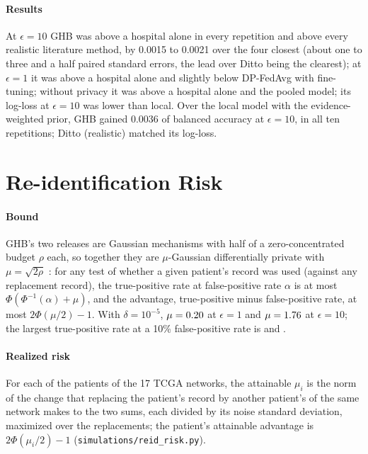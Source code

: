 \documentclass[acmsmall,screen,nonacm]{acmart}
\theoremstyle{acmdefinition}
\begin{document}
\paragraph{Results} At $\epsilon=10$ GHB was above a hospital alone in every repetition and above every realistic literature method, by 0.0015 to 0.0021 over the four closest (about one to three and a half paired standard errors, the lead over Ditto \cite{li2021ditto} being the clearest); at $\epsilon=1$ it was above a hospital alone and slightly below DP-FedAvg \cite{mcmahan2018learning} with fine-tuning; without privacy it was above a hospital alone and the pooled model; its log-loss at $\epsilon=10$ was lower than local. Over the local model with the evidence-weighted prior, GHB gained 0.0036 of balanced accuracy at $\epsilon=10$, in all ten repetitions; Ditto (realistic) matched its log-loss.

\section{Re-identification Risk}\label{sec:reid}

\paragraph{Bound} GHB's two releases are Gaussian mechanisms with half of a zero-concentrated budget $\rho$ each, so together they are $\mu$-Gaussian differentially private with $\mu=\sqrt{2\rho}$ \cite{dong2022gaussian}: for any test of whether a given patient's record was used (against any replacement record), the true-positive rate at false-positive rate $\alpha$ is at most $\Phi(\Phi^{-1}(\alpha)+\mu)$, and the advantage, true-positive minus false-positive rate, at most $2\Phi(\mu/2)-1$. With $\delta=10^{-5}$, $\mu=0.20$ at $\epsilon=1$ and $\mu=1.76$ at $\epsilon=10$; the largest true-positive rate at a 10\% false-positive rate is \SimReidOneTprTen{} and \SimReidTenTprTen.

\paragraph{Realized risk} For each of the \SimReidPatients{} patients of the 17 TCGA networks, the attainable $\mu_i$ is the norm of the change that replacing the patient's record by another patient's of the same network makes to the two sums, each divided by its noise standard deviation, maximized over the replacements; the patient's attainable advantage is $2\Phi(\mu_i/2)-1$ (\texttt{simulations/reid\_risk.py}).
\end{document}
